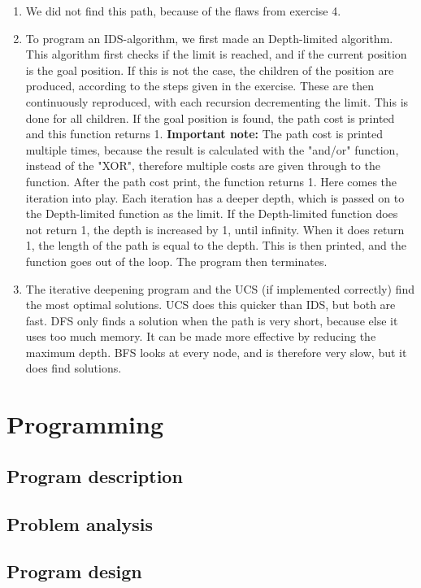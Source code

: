 \documentclass{article}
\begin{document}
\begin{enumerate}
		\item We did not find this path, because of the flaws from exercise 4.
		
		\item To program an IDS-algorithm, we first made an Depth-limited algorithm. This algorithm first checks if the limit is reached, and if the current position is the goal position. If this is not the case, the children of the position are produced, according to the steps given in the exercise. These are then continuously reproduced, with each recursion decrementing the limit. This is done for all children. If the goal position is found, the path cost is printed and this function returns 1. \textbf{Important note:} The path cost is printed multiple times, because the result is calculated with the "and/or" function, instead of the "XOR", therefore multiple costs are given through to the function. After the path cost print, the function returns 1. Here comes the iteration into play. Each iteration has a deeper depth, which is passed on to the Depth-limited function as the limit. If the Depth-limited function does not return 1, the depth is increased by 1, until infinity. When it does return 1, the length of the path is equal to the depth. This is then printed, and the function goes out of the loop. The program then terminates.
		
		\item The iterative deepening program and the UCS (if implemented correctly) find the most optimal solutions. UCS does this quicker than IDS, but both are fast. DFS only finds a solution when the path is very short, because else it uses too much memory. It can be made more effective by reducing the maximum depth. BFS looks at every node, and is therefore very slow, but it does find solutions.
	\end{enumerate}
	\section*{Programming} 
	\subsection*{Program description}
	
	\subsection*{Problem analysis}
	
	
	\subsection*{Program design}
	
\end{document}
